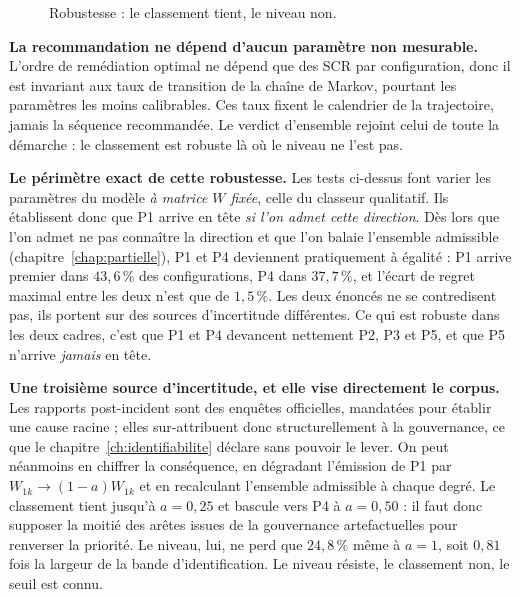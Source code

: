 \begin{figure}[htbp]\centering
{}
\caption{Robustesse : le classement tient, le niveau non.}
\label{fig:robust}
\end{figure}

\begin{cle}
\textbf{La recommandation ne dépend d'aucun paramètre non mesurable.} L'ordre de remédiation
optimal ne dépend que des SCR par configuration, donc il est invariant aux taux de
transition de la chaîne de Markov, pourtant les paramètres les moins calibrables. Ces taux
fixent le calendrier de la trajectoire, jamais la séquence recommandée. Le verdict d'ensemble
rejoint celui de toute la démarche : le classement est robuste là où le niveau ne l'est pas.
\end{cle}

\begin{attention}
\textbf{Le périmètre exact de cette robustesse.} Les tests ci-dessus font
varier les paramètres du modèle \emph{à matrice $W$ fixée}, celle du classeur qualitatif. Ils
établissent donc que P1 arrive en tête \emph{si l'on admet cette direction}. Dès lors que l'on
admet ne pas connaître la direction et que l'on balaie l'ensemble admissible
(chapitre~\ref{chap:partielle}), P1 et P4 deviennent pratiquement à égalité : P1 arrive
premier dans $43{,}6\,\%$ des configurations, P4 dans $37{,}7\,\%$, et l'écart de regret maximal entre
les deux n'est que de $1{,}5\,\%$. Les deux énoncés ne se contredisent pas, ils portent sur des
sources d'incertitude différentes. Ce qui est robuste dans les deux cadres, c'est que P1 et P4
devancent nettement P2, P3 et P5, et que P5 n'arrive \emph{jamais} en tête.

\medskip
\noindent\textbf{Une troisième source d'incertitude, et elle vise directement le corpus.} Les
rapports post-incident sont des enquêtes officielles, mandatées pour établir une cause racine ;
elles sur-attribuent donc structurellement à la gouvernance, ce que le
chapitre~\ref{ch:identifiabilite} déclare sans pouvoir le lever. On peut néanmoins en chiffrer la
conséquence, en dégradant l'émission de P1 par $W_{1k}\to(1-a)W_{1k}$ et en recalculant l'ensemble
admissible à chaque degré. Le classement tient jusqu'à $a=0{,}25$ et bascule vers P4 à
$a=0{,}50$ : il faut donc supposer la moitié des arêtes issues de la gouvernance
artefactuelles pour renverser la priorité. Le niveau, lui, ne perd que $24{,}8\,\%$ même à
$a=1$, soit $0{,}81$ fois la largeur de la bande d'identification. Le niveau résiste, le
classement non, le seuil est connu.
\end{attention}

